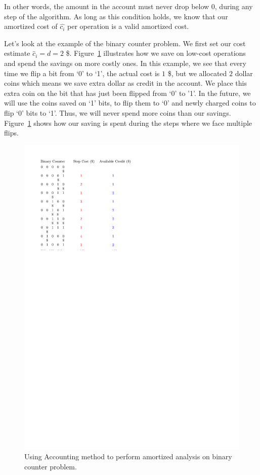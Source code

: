 \documentclass[11pt]{article}
\theoremstyle{definition}
\begin{document}
In other words, the amount in the account must never drop below 0, during any step of the algorithm.  As long as this condition holds, we know that our amortized cost of $\hat{c_i}$ per operation is a valid amortized cost. 

Let's look at the example of the binary counter problem. 
We first set our cost estimate $\hat{c}_i = d = 2$ \$. Figure~\ref{fig:accounting}
illustrates how we save on low-cost operations and spend the savings on more costly ones.  In this example, we see that every time we
flip a bit from `0' to `1', the actual cost is $1$ \$, but we allocated $2$ dollar coins which means we save extra dollar as credit in the account.  We place this extra coin on the bit that has just been flipped from `0' to '1'. In the future, we will use the coins saved on `1' bits, to flip them to `0' and newly charged coins to flip `0' bits to `1'. Thus, we will never spend more coins than our savings. Figure~\ref{fig:accounting} shows how our saving is spent during the steps where we face multiple flips. 
\begin{figure}[tbh]
\centering
\includegraphics[scale=1]{accounting.pdf}
\caption{Using Accounting method to perform amortized analysis on binary counter problem.}
\label{fig:accounting}
\end{figure}
\end{document}
